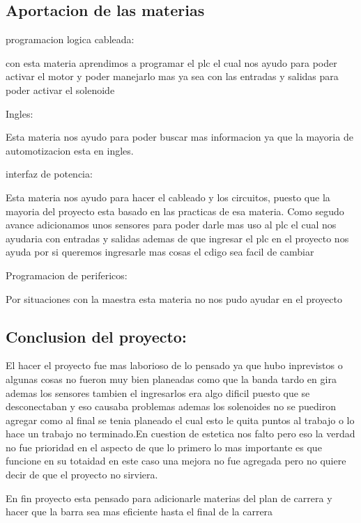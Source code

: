 \documentclass[12pt,a4paper]{article}
\begin{document}
\subsection{Aportacion de las materias}
\begin{flushleft}
programacion logica cableada:
\end{flushleft}
\begin{center}
con esta materia aprendimos a programar el plc el cual nos ayudo  para poder activar el motor y poder manejarlo mas ya sea con las entradas y salidas para poder activar el solenoide 
\end{center}
\begin{flushleft}
Ingles:
\end{flushleft}
\begin{center}
Esta materia nos ayudo para poder buscar mas informacion ya que la mayoria de automotizacion esta en ingles.
\end{center}
\begin{flushleft}
interfaz de potencia:
\end{flushleft}
\begin{center}
Esta materia nos ayudo para hacer el cableado y los circuitos, puesto que la mayoria del proyecto esta basado en las practicas de esa materia. Como segudo avance adicionamos unos sensores para poder darle mas uso al plc el cual nos ayudaria con entradas y salidas ademas de que ingresar el plc en el proyecto nos ayuda por si queremos ingresarle mas cosas el cdigo sea facil de cambiar  
\end{center}
\begin{flushleft}
Programacion de perifericos:
\end{flushleft}
\begin{center}
Por situaciones con la maestra esta materia no nos pudo ayudar en el proyecto
\end{center}
\subsection{Conclusion del proyecto:}
\begin{flushleft}
El hacer el proyecto fue mas laborioso de lo pensado ya que  hubo inprevistos o algunas cosas no fueron muy bien planeadas como que la banda tardo en gira ademas los sensores tambien el ingresarlos era algo dificil puesto que se desconectaban y eso causaba problemas ademas los solenoides no se puediron agregar como al final se tenia planeado el cual esto le quita puntos al trabajo o lo hace un trabajo no terminado.En cuestion de estetica nos falto pero eso la verdad no fue prioridad en el aspecto de que lo primero lo mas importante es que funcione en su totaidad en este caso una mejora no fue agregada pero no quiere decir de que el proyecto no sirviera.
\end{flushleft}
\begin{flushleft}
En fin  proyecto esta pensado para adicionarle materias del plan de carrera  y hacer que la barra sea mas eficiente hasta el final de la carrera 
\end{flushleft}
\end{document}
